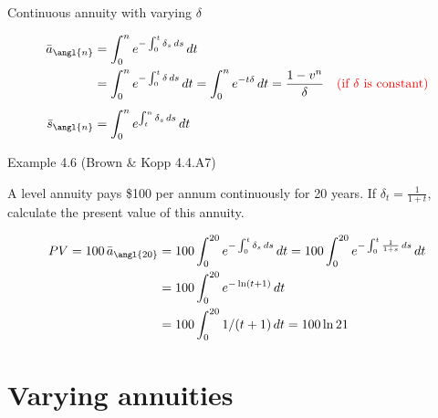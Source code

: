 \documentclass{beamer}
\begin{document}
\begin{frame}{Continuous annuity with varying $\delta$}

\begin{center}
\end{center}

\begin{align*}
\bar{a}_{\angl{n}} &= \int_0^n e^{-\int_0^t \delta_s\,ds}\,dt \\
&= \int_0^n e^{-\int_0^t \delta\,ds}\,dt = \int_0^n e^{-t\delta}\,dt = \frac{1-v^n}{\delta} \quad \text{\textcolor{red}{(if $\delta$ is constant)}} \\[1ex]
\bar{s}_{\angl{n}} &= \int_0^n e^{\int_t^n \delta_s\,ds}\,dt
\end{align*}

\end{frame}

\begin{frame}{Example 4.6 (Brown \& Kopp 4.4.A7)}

A level annuity pays \$100 per annum continuously for 20 years. If $\delta_t = \frac{1}{1+t}$, calculate the present value of this annuity.

\begin{align*}
PV = 100\,\bar{a}_{\angl{20}} &= 100\int_0^{20} e^{-\int_0^t \delta_s\,ds}\,dt = 100\int_0^{20} e^{-\int_0^t \frac{1}{1+s}\,ds}\,dt \\
&= 100\int_0^{20} e^{-\ln(t+1)}\,dt \\
&= 100\int_0^{20} 1/(t+1)\,dt = 100\ln 21
\end{align*}

\end{frame}

\section{Varying annuities}
\end{document}
